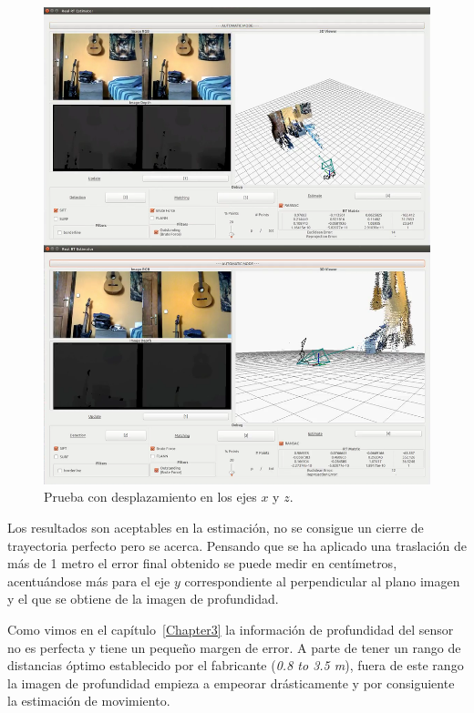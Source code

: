 \begin{figure}[th]
\centering
\includegraphics[scale=0.3]{Figures/tests/axis-x-z.png}
\decoRule
\caption[Prueba con desplazamiento en los ejes $x$ y $z$]{Prueba con desplazamiento en los ejes $x$ y $z$.}
\label{fig:axis-xz}
\end{figure}

Los resultados son aceptables en la estimación, no se consigue un cierre de trayectoria perfecto pero se acerca. Pensando que se ha aplicado una traslación de más de 1 metro el error final obtenido se puede medir en centímetros, acentuándose más para el eje $y$ correspondiente al perpendicular al plano imagen y el que se obtiene de la imagen de profundidad.

Como vimos en el capítulo~\ref{Chapter3} la información de profundidad del sensor no es perfecta y tiene un pequeño margen de error. A parte de tener un rango de distancias óptimo establecido por el fabricante (\textit{0.8 to 3.5 m}), fuera de este rango la imagen de profundidad empieza a empeorar drásticamente y por consiguiente la estimación de movimiento.

